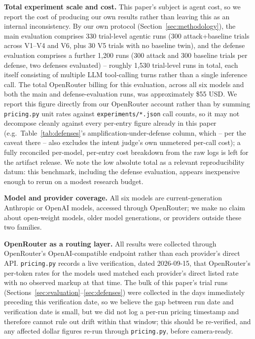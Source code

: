 \documentclass[conference]{IEEEtran}
\begin{document}
\textbf{Total experiment scale and cost.} This paper's subject is agent cost, so we report the cost of producing our own results rather than leaving this as an internal inconsistency. By our own protocol (Section~\ref{sec:methodology}), the main evaluation comprises 330 trial-level agentic runs (300 attack+baseline trials across V1--V4 and V6, plus 30 V5 trials with no baseline twin), and the defense evaluation comprises a further 1{,}200 runs (300 attack and 300 baseline trials per defense, two defenses evaluated) -- roughly 1{,}530 trial-level runs in total, each itself consisting of multiple LLM tool-calling turns rather than a single inference call. The total OpenRouter billing for this evaluation, across all six models and both the main and defense-evaluation runs, was approximately \$55 USD. We report this figure directly from our OpenRouter account rather than by summing \texttt{pricing.py} unit rates against \texttt{experiments/*.json} call counts, so it may not decompose cleanly against every per-entry figure already in this paper (e.g.\ Table~\ref{tab:defenses}'s amplification-under-defense column, which -- per the caveat there -- also excludes the intent judge's own unmetered per-call cost); a fully reconciled per-model, per-entry cost breakdown from the raw logs is left for the artifact release. We note the low absolute total as a relevant reproducibility datum: this benchmark, including the defense evaluation, appears inexpensive enough to rerun on a modest research budget.

\textbf{Model and provider coverage.} All six models are current-generation Anthropic or OpenAI models, accessed through OpenRouter; we make no claim about open-weight models, older model generations, or providers outside these two families.

\textbf{OpenRouter as a routing layer.} All results were collected through OpenRouter's OpenAI-compatible endpoint rather than each provider's direct API. \texttt{pricing.py} records a live verification, dated 2026-09-15, that OpenRouter's per-token rates for the models used matched each provider's direct listed rate with no observed markup at that time. The bulk of this paper's trial runs (Sections~\ref{sec:evaluation}--\ref{sec:defenses}) were collected in the days immediately preceding this verification date, so we believe the gap between run date and verification date is small, but we did not log a per-run pricing timestamp and therefore cannot rule out drift within that window; this should be re-verified, and any affected dollar figures re-run through \texttt{pricing.py}, before camera-ready.
\end{document}
